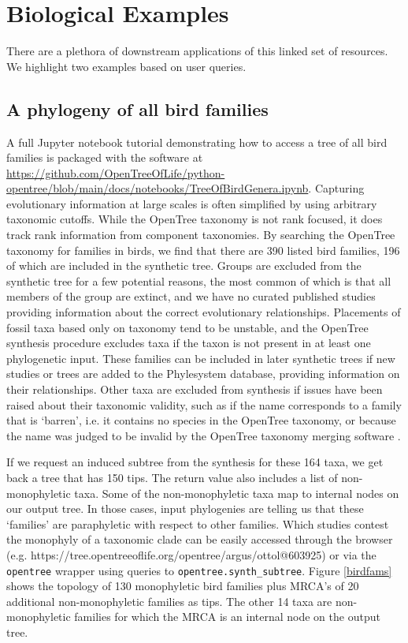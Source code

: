 \documentclass[oupdraft]{sysbio_sse}
\begin{document}
\bigskip

\section{Biological Examples}
\label{sec4}

There are a plethora of downstream applications of this linked set of resources.
We highlight two examples based on user queries.


\subsection{A phylogeny of all bird families}
A full Jupyter notebook tutorial demonstrating how to access a tree of all bird families is packaged with the software at \url{https://github.com/OpenTreeOfLife/python-opentree/blob/main/docs/notebooks/TreeOfBirdGenera.ipynb}.
Capturing evolutionary information at large scales is often simplified by using arbitrary taxonomic cutoffs.
While the OpenTree taxonomy is not rank focused, it does track rank information from component taxonomies.
By searching the OpenTree taxonomy for families in birds, we find that there are 390 listed bird families, 196 of which are included in the synthetic tree.
Groups are excluded from the synthetic tree for a few potential reasons, the most common of which is that all members of the group are extinct, and we have no curated published studies providing information about the correct evolutionary relationships.
Placements of fossil taxa based only on taxonomy tend to be unstable, and the OpenTree synthesis procedure excludes taxa if the taxon is not present in at least one  phylogenetic input.
These families can be included in later synthetic trees if new studies or trees are added to the Phylesystem database, providing information on their relationships.
Other taxa are excluded from synthesis if issues have been raised about their taxonomic validity, such as if the name corresponds to a family that is `barren', i.e. it contains no species in the OpenTree taxonomy, or because the name was judged to be invalid by the OpenTree taxonomy merging software \citep{rees_automated_2017}.

If we request an induced subtree from the synthesis for these 164 taxa, we get back a tree that has 150 tips. The return value also includes a list of non-monophyletic taxa.
Some of the non-monophyletic taxa map to internal nodes on our output tree. In those cases, input phylogenies are telling us that these `families' are paraphyletic with respect to other families. Which studies contest the monophyly of a taxonomic clade can be easily accessed through the browser (e.g. https://tree.opentreeoflife.org/opentree/argus/ottol@603925) or via the \texttt{opentree} wrapper using queries to \texttt{opentree.synth\_subtree}. Figure \ref{birdfams} shows the topology of 130 monophyletic bird families plus MRCA's of 20 additional non-monophyletic families as tips. The other 14 taxa are non-monophyletic families for which the MRCA is an internal node on the output tree.
\end{document}
